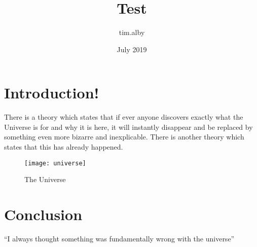 \documentclass{article}
\title{Test}
\author{tim.alby }
\date{July 2019}
\begin{document}
\maketitle
\cite{adams1995hitchhiker}
\section{Introduction!}
There is a theory which states that if ever anyone discovers exactly what the Universe is for and why it is here, it will instantly disappear and be replaced by something even more bizarre and inexplicable.
There is another theory which states that this has already happened.

\begin{figure}[h!]
\centering
\texttt{[image: universe]}
\caption{The Universe}
\label{fig:universe}
\end{figure}

\section{Conclusion}
``I always thought something was fundamentally wrong with the universe'' \citep{adams1995hitchhiker}



\end{document}
